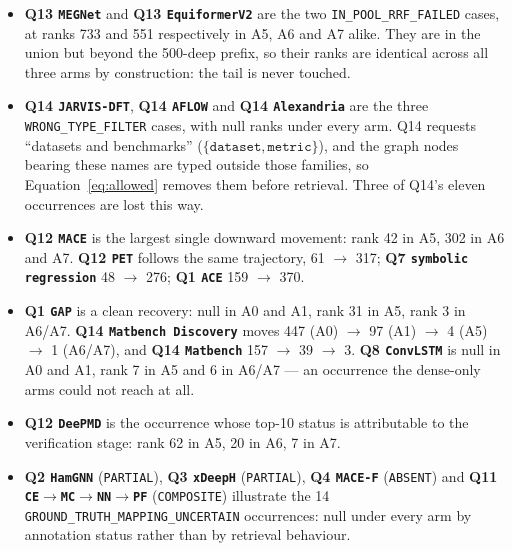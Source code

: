 \documentclass[11pt,a4paper]{article}
\begin{document}
\begin{itemize}
\item \textbf{Q13 \texttt{MEGNet}} and \textbf{Q13 \texttt{EquiformerV2}} are the two
\texttt{IN\_POOL\_RRF\_FAILED} cases, at ranks 733 and 551 respectively in A5, A6 and A7 alike. They are in
the union but beyond the 500-deep prefix, so their ranks are identical across all three arms by
construction: the tail is never touched.

\item \textbf{Q14 \texttt{JARVIS-DFT}}, \textbf{Q14 \texttt{AFLOW}} and \textbf{Q14 \texttt{Alexandria}} are
the three \texttt{WRONG\_TYPE\_FILTER} cases, with null ranks under every arm. Q14 requests ``datasets and
benchmarks'' ($\{\texttt{dataset}, \texttt{metric}\}$), and the graph nodes bearing these names are typed
outside those families, so Equation~\eqref{eq:allowed} removes them before retrieval. Three of Q14's eleven
occurrences are lost this way.

\item \textbf{Q12 \texttt{MACE}} is the largest single downward movement: rank 42 in A5, 302 in A6 and A7.
\textbf{Q12 \texttt{PET}} follows the same trajectory, 61 $\to$ 317; \textbf{Q7 \texttt{symbolic
regression}} 48 $\to$ 276; \textbf{Q1 \texttt{ACE}} 159 $\to$ 370.

\item \textbf{Q1 \texttt{GAP}} is a clean recovery: null in A0 and A1, rank 31 in A5, rank 3 in A6/A7.
\textbf{Q14 \texttt{Matbench Discovery}} moves 447 (A0) $\to$ 97 (A1) $\to$ 4 (A5) $\to$ 1 (A6/A7), and
\textbf{Q14 \texttt{Matbench}} 157 $\to$ 39 $\to$ 3. \textbf{Q8 \texttt{ConvLSTM}} is null in A0 and A1,
rank 7 in A5 and 6 in A6/A7 --- an occurrence the dense-only arms could not reach at all.

\item \textbf{Q12 \texttt{DeePMD}} is the occurrence whose top-10 status is attributable to the verification
stage: rank 62 in A5, 20 in A6, 7 in A7.

\item \textbf{Q2 \texttt{HamGNN}} (\texttt{PARTIAL}), \textbf{Q3 \texttt{xDeepH}} (\texttt{PARTIAL}),
\textbf{Q4 \texttt{MACE-F}} (\texttt{ABSENT}) and \textbf{Q11
\texttt{CE}$\rightarrow$\allowbreak\texttt{MC}$\rightarrow$\allowbreak\texttt{NN}$\rightarrow$\allowbreak\texttt{PF}} (\texttt{COMPOSITE})
illustrate the 14 \texttt{GROUND\_TRUTH\_MAPPING\_UNCERTAIN} occurrences: null under every arm by
annotation status rather than by retrieval behaviour.
\end{itemize}
\end{document}
